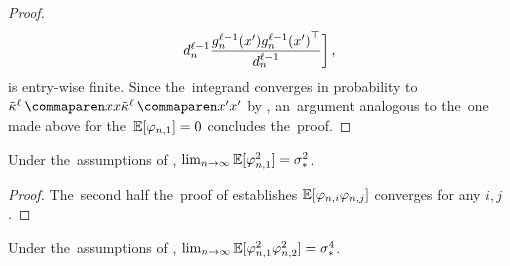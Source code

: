\begin{proof}
\begin{align*}
{            }{d_{n}^{\ell- 1}}
            \frac{
                {g}^{\ell - 1}_{n}{(x')} 
                {g}^{\ell - 1}_{n}{(x')}^\top
            }{d_{n}^{\ell - 1}}
        \biggr]
        \, ,
    \end{align*}
    is entry-wise finite.
    Since the~integrand converges in probability to $\kerntildef{}{\depthSymbol}{\inputSymbol}{\inputSymbol} \kerntildef{}{\depthSymbol}{\inputSymbol'}{\inputSymbol'}$ by , an~argument analogous to the~one made above for the~$\operatorname*{\mathbb{E}} [\varphi_{n, 1}] = 0$ concludes the~proof.
\end{proof}


\begin{corollary}\label{cor:logit_var_convergence}
    Under the~assumptions of , $\lim_{n \to \infty} \operatorname*{\mathbb{E}} \lbrack \varphi_{n , 1}^2 \rbrack = \sigma^2_{*}$.
\end{corollary}

\begin{proof}
    The~second half the~proof of  establishes $\operatorname*{\mathbb{E}} [\varphi_{n, i} \varphi_{n, j}]$ converges for any $i, j$.
\end{proof}

\vspace{0.5\baselineskip}
\begin{lemma}\label{lem:logit_square_moments}
    Under the~assumptions of , $\lim_{n \to \infty} \operatorname*{\mathbb{E}} \lbrack \varphi_{n , 1}^2 \varphi_{n , 2}^2 \rbrack = \sigma_{*}^{4}$.
\end{lemma}

